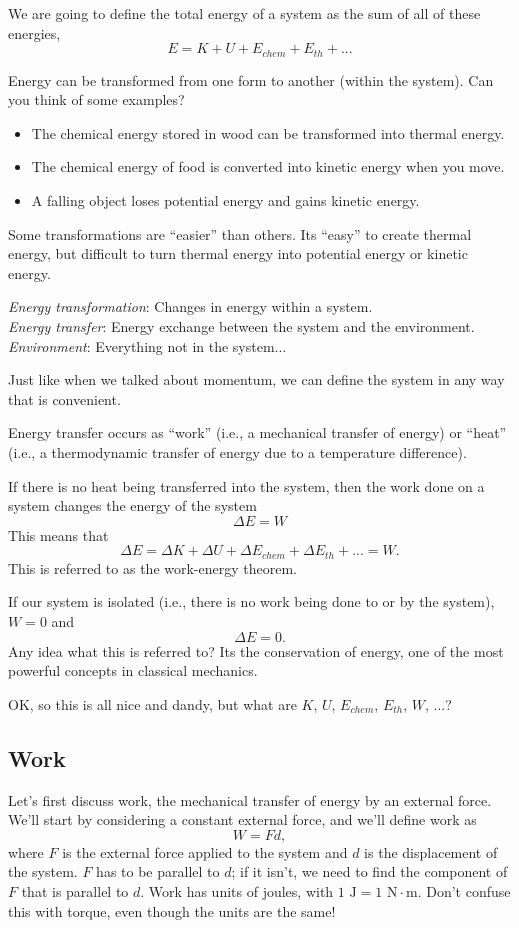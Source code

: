 We are going to define the total energy of a system as the sum of all of these energies,
$$E=K+U+E_{chem}+E_{th}+...$$

Energy can be transformed from one form to another (within the system). Can you think of some examples?
\begin{itemize}
\item The chemical energy stored in wood can be transformed into thermal energy.
\item The chemical energy of food is converted into kinetic energy when you move.
\item A falling object loses potential energy and gains kinetic energy.
\end{itemize}

Some transformations are ``easier'' than others. Its ``easy'' to create thermal energy, but difficult to turn thermal energy into potential energy or kinetic energy.

\textit{Energy transformation}: Changes in energy within a system.\\
\textit{Energy transfer}: Energy exchange between the system and the environment.\\
\textit{Environment}: Everything not in the system...

Just like when we talked about momentum, we can define the system in any way that is convenient.

Energy transfer occurs as ``work'' (i.e., a mechanical transfer of energy) or ``heat'' (i.e., a thermodynamic transfer of energy due to a temperature difference).

If there is no heat being transferred into the system, then the work done on a system changes the energy of the system
$$\Delta E=W$$
This means that
$$\Delta{E}=\Delta{K}+\Delta{U}+\Delta{E_{chem}}+\Delta{E_{th}}+...=W.$$
This is referred to as the work-energy theorem.

If our system is isolated (i.e., there is no work being done to or by the system), $W=0$ and 
$$\Delta{E}=0.$$
Any idea what this is referred to? Its the conservation of energy, one of the most powerful concepts in classical mechanics.

OK, so this is all nice and dandy, but what are $K$, $U$, $E_{chem}$, $E_{th}$, $W$, $...$?

\subsection{Work}
Let's first discuss work, the mechanical transfer of energy by an external force. We'll start by considering a constant external force, and we'll define work as 
$$W=Fd,$$
where $F$ is the external force applied to the system and $d$ is the displacement of the system. $F$ has to be parallel to $d$; if it isn't, we need to find the component of $F$ that is parallel to $d$. Work has units of joules, with $1\mbox{ J}=1\mbox{ N}\cdot\mbox{m}$. Don't confuse this with torque, even though the units are the same!

